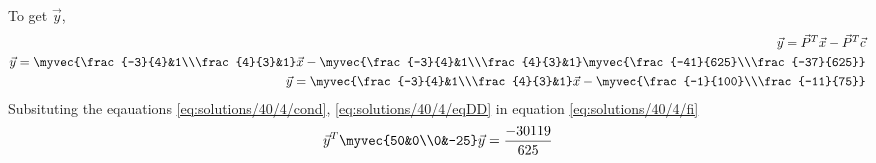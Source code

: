 To get $\vec{y}$,
\begin{align}
    \vec{y}=\vec{P}^T\vec{x}-\vec{P}^T\vec{c}\\
    \vec{y}=\myvec{\frac{-3}{4}&1\\\frac{4}{3}&1}\vec{x}-
    \myvec{\frac{-3}{4}&1\\\frac{4}{3}&1}\myvec{\frac{-41}{625}\\\frac{-37}{625}}\\
    \vec{y}=\myvec{\frac{-3}{4}&1\\\frac{4}{3}&1}\vec{x}-
    \myvec{\frac{-1}{100}\\\frac{-11}{75}}
\end{align}
Subsituting the eqauations \eqref{eq:solutions/40/4/cond}, \eqref{eq:solutions/40/4/eqDD} in equation \eqref{eq:solutions/40/4/fi}
\begin{align}
    \vec{y}^T\myvec{50&0\\0&-25}\vec{y}=\frac{-30119}{625}
\end{align}
